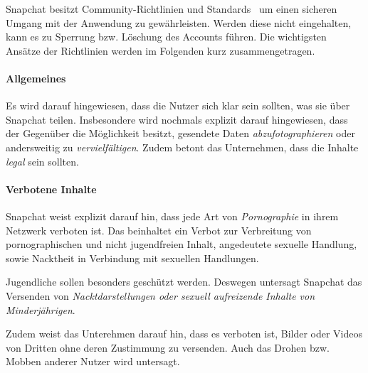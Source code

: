 Snapchat besitzt Community-Richtlinien und Standards~\cite{sc_richtlinien} um
einen sicheren Umgang mit der Anwendung zu gew\"ahrleisten. Werden diese nicht
eingehalten, kann es zu Sperrung bzw. L\"oschung des Accounts f\"uhren. Die
wichtigsten Ans\"atze der Richtlinien werden im Folgenden kurz
zusammengetragen.

\paragraph{Allgemeines}
Es wird darauf hingewiesen, dass die Nutzer sich klar sein sollten, was sie
\"uber Snapchat teilen. Insbesondere wird nochmals explizit darauf hingewiesen,
dass der Gegen\"uber die M\"oglichkeit besitzt, gesendete Daten
\emph{abzufotographieren} oder andersweitig zu \emph{vervielf\"altigen}. Zudem
betont das Unternehmen, dass die Inhalte \emph{legal} sein sollten.

\paragraph{Verbotene Inhalte}
Snapchat weist explizit darauf hin, dass jede Art von \emph{Pornographie} in
ihrem Netzwerk verboten ist. Das beinhaltet ein Verbot zur Verbreitung von
pornographischen und nicht jugendfreien Inhalt, angedeutete sexuelle Handlung,
sowie Nacktheit in Verbindung mit sexuellen Handlungen.

Jugendliche sollen besonders gesch\"utzt werden. Deswegen untersagt Snapchat
das Versenden von \emph{Nacktdarstellungen oder sexuell aufreizende Inhalte von
Minderj\"ahrigen}.

Zudem weist das Unterehmen darauf hin, dass es verboten ist, Bilder oder Videos
von Dritten ohne deren Zustimmung zu versenden. Auch das Drohen bzw. Mobben
anderer Nutzer wird untersagt.
